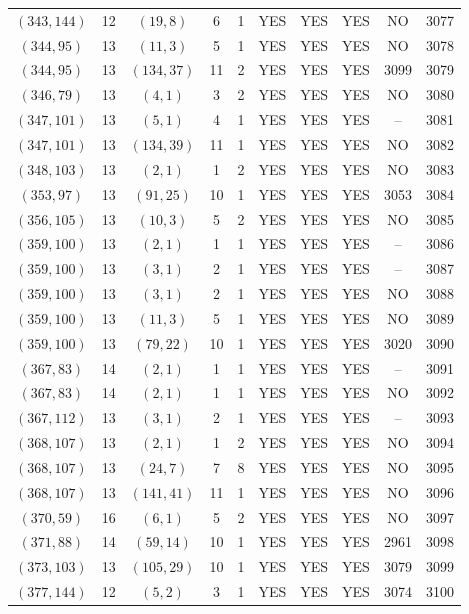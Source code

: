 \begin{longtable}{|c|c|c|c|c|c|c|c|c|c|}
$(343, 144)$ & 12 & $(19, 8)$ & 6 & 1 & YES & YES & YES & NO & 3077\\
$(344, 95)$ & 13 & $(11, 3)$ & 5 & 1 & YES & YES & YES & NO & 3078\\
$(344, 95)$ & 13 & $(134, 37)$ & 11 & 2 & YES & YES & YES & 3099 & 3079\\
$(346, 79)$ & 13 & $(4, 1)$ & 3 & 2 & YES & YES & YES & NO & 3080\\
$(347, 101)$ & 13 & $(5, 1)$ & 4 & 1 & YES & YES & YES & -- & 3081\\
$(347, 101)$ & 13 & $(134, 39)$ & 11 & 1 & YES & YES & YES & NO & 3082\\
$(348, 103)$ & 13 & $(2, 1)$ & 1 & 2 & YES & YES & YES & NO & 3083\\
$(353, 97)$ & 13 & $(91, 25)$ & 10 & 1 & YES & YES & YES & 3053 & 3084\\
$(356, 105)$ & 13 & $(10, 3)$ & 5 & 2 & YES & YES & YES & NO & 3085\\
$(359, 100)$ & 13 & $(2, 1)$ & 1 & 1 & YES & YES & YES & -- & 3086\\
$(359, 100)$ & 13 & $(3, 1)$ & 2 & 1 & YES & YES & YES & -- & 3087\\
$(359, 100)$ & 13 & $(3, 1)$ & 2 & 1 & YES & YES & YES & NO & 3088\\
$(359, 100)$ & 13 & $(11, 3)$ & 5 & 1 & YES & YES & YES & NO & 3089\\
$(359, 100)$ & 13 & $(79, 22)$ & 10 & 1 & YES & YES & YES & 3020 & 3090\\
$(367, 83)$ & 14 & $(2, 1)$ & 1 & 1 & YES & YES & YES & -- & 3091\\
$(367, 83)$ & 14 & $(2, 1)$ & 1 & 1 & YES & YES & YES & NO & 3092\\
$(367, 112)$ & 13 & $(3, 1)$ & 2 & 1 & YES & YES & YES & -- & 3093\\
$(368, 107)$ & 13 & $(2, 1)$ & 1 & 2 & YES & YES & YES & NO & 3094\\
$(368, 107)$ & 13 & $(24, 7)$ & 7 & 8 & YES & YES & YES & NO & 3095\\
$(368, 107)$ & 13 & $(141, 41)$ & 11 & 1 & YES & YES & YES & NO & 3096\\
$(370, 59)$ & 16 & $(6, 1)$ & 5 & 2 & YES & YES & YES & NO & 3097\\
$(371, 88)$ & 14 & $(59, 14)$ & 10 & 1 & YES & YES & YES & 2961 & 3098\\
$(373, 103)$ & 13 & $(105, 29)$ & 10 & 1 & YES & YES & YES & 3079 & 3099\\
$(377, 144)$ & 12 & $(5, 2)$ & 3 & 1 & YES & YES & YES & 3074 & 3100\\

\end{longtable}
